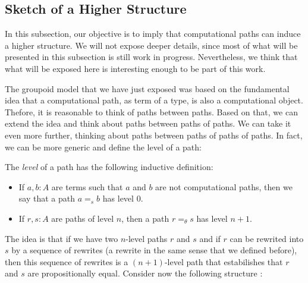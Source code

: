 \documentclass{entcs} \usepackage{entcsmacro}
\begin{document}
\subsection{Sketch of a Higher Structure}

In this subsection, our objective is to imply that computational paths can induce a higher structure. We will not expose deeper details, since most of what will be presented in this subsection is still work in progress. Nevertheless, we think that what will be exposed here is interesting enough to be part of this work. 

The groupoid model that we have just exposed was based on the fundamental idea that a computational path, as term of a type, is also a computational object. Thefore, it is reasonable to think of paths between paths. Based on that, we can extend the idea and think about paths between paths of paths. We can take it even more further, thinking about paths between paths of paths of paths. In fact, we can be more generic and define the level of a path:

\begin{definition}

The \emph{level} of a path has the following inductive definition:

\begin{itemize}

\item If $a,b : A$ are terms such that $a$ and $b$ are not computational paths, then we say that a path $a =_{s} b$ has level 0.

\item If $r,s: A$ are paths of level $n$, then a path $r =_{\theta} s$ has level $n + 1$.

\end{itemize}

\end{definition}

The idea is that if we have two $n$-level paths $r$ and $s$ and if  $r$ can be rewrited into $s$ by a sequence of rewrites (a rewrite in the same sense that we defined before), then this sequence of rewrites is a $(n+1)$-level path that estabilishes that $r$ and $s$ are propositionally equal. Consider now the following structure \cite{Tom}:
\end{document}

